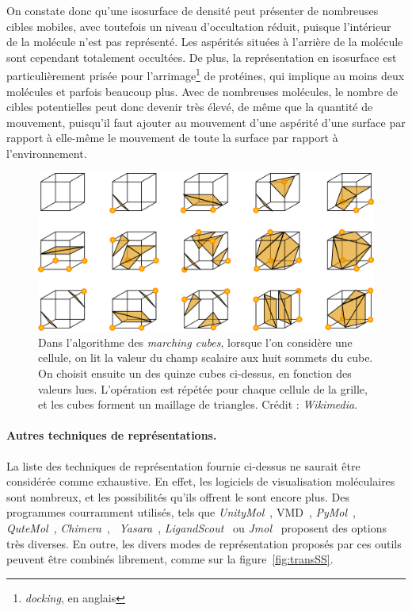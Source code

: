 	
	On constate donc qu'une isosurface de densité peut présenter de nombreuses cibles mobiles, avec toutefois un niveau d'occultation réduit, puisque l'intérieur de la molécule n'est pas représenté. Les aspérités situées à \og l'arrière \fg{} de la molécule sont cependant totalement occultées. De plus, la représentation en isosurface est particulièrement prisée pour l'arrimage\footnote{\emph{docking}, en anglais} de protéines, qui implique au moins deux molécules et parfois beaucoup plus. Avec de nombreuses molécules, le nombre de cibles potentielles peut donc devenir très élevé, de même que la quantité de mouvement, puisqu'il faut ajouter au mouvement d'une aspérité d'une surface par rapport à elle-même le mouvement de toute la surface par rapport à l'environnement.
	
	\begin{figure}[H]
		\centering
		\includegraphics[width=\textwidth]{figures/ch1/marchingCubes}
		\caption{Dans l'algorithme des \emph{marching cubes}, lorsque l'on considère une cellule, on lit la valeur du champ scalaire aux huit sommets du cube. On choisit ensuite un des quinze cubes ci-dessus, en fonction des valeurs lues. L'opération est répétée pour chaque cellule de la grille, et les cubes forment un maillage de triangles. Crédit : \emph{Wikimedia}.}
		\label{fig:marchingCubes}
	\end{figure}
	
	\paragraph{Autres techniques de représentations.}
	La liste des techniques de représentation fournie ci-dessus ne saurait être considérée comme exhaustive. En effet, les logiciels de visualisation moléculaires sont nombreux, et les possibilités qu'ils offrent le sont encore plus. Des programmes courramment utilisés, tels que \emph{UnityMol}~\cite{doutreligne2014unitymol}, VMD~\cite{humphrey1996vmd}, \emph{PyMol}~\cite{delano2002pymol}, \emph{QuteMol}~\cite{tarini2006ambient, tarini2006qutemol}, \emph{Chimera}~\cite{pettersen2004ucsf}, ~\emph{Yasara}~\cite{krieger2014yasara}, \emph{LigandScout}~\cite{wolber2005ligandscout} ou \emph{Jmol}~\cite{herraez2006biomolecules} proposent des options très diverses. En outre, les divers modes de représentation proposés par ces outils peuvent être combinés librement, comme sur la figure~\ref{fig:transSS}.
	

